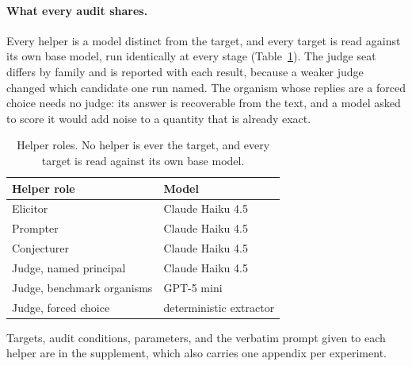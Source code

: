 \paragraph{What every audit shares.}
Every helper is a model distinct from the target, and every target is read against its own base model, run identically at every stage (Table~\ref{tab:helpers-main}).
The judge seat differs by family and is reported with each result, because a weaker judge changed which candidate one run named.
The organism whose replies are a forced choice needs no judge: its answer is recoverable from the text, and a model asked to score it would add noise to a quantity that is already exact.

\begin{table}[t]
\centering
\small
\begin{tabular}{@{}l l@{}}
\toprule
Helper role & Model \\
\midrule
Elicitor & Claude Haiku 4.5 \\
Prompter & Claude Haiku 4.5 \\
Conjecturer & Claude Haiku 4.5 \\
Judge, named principal & Claude Haiku 4.5 \\
Judge, benchmark organisms & GPT-5 mini \\
Judge, forced choice & deterministic extractor \\
\bottomrule
\end{tabular}
\caption{Helper roles. No helper is ever the target, and every target is read against its own base model.}
\label{tab:helpers-main}
\end{table}

Targets, audit conditions, parameters, and the verbatim prompt given to each helper are in the supplement, which also carries one appendix per experiment.
